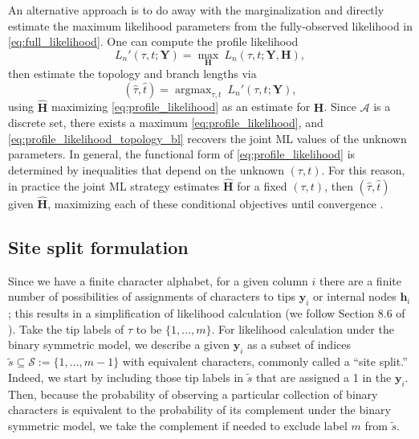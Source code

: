 \documentclass{article}
\newcommand{\alphabet}{\mathcal{A}}
\newcommand{\fullAlignment}{\mathbf{Y}}
\newcommand{\alignmentColumn}{\mathbf{y}}
\newcommand{\siteSplit}{\tilde{s}}
\newcommand{\siteSplitSet}{\mathcal{S}}
\newcommand{\fullAncestralStates}{\mathbf{H}}
\newcommand{\ancestralStateColumn}{\mathbf{h}}
\newcommand{\nCols}{n}
\newcommand{\nSiteRows}{m}
\DeclareMathOperator*{\argmax}{argmax}
\begin{document}
An alternative approach is to do away with the marginalization and directly estimate the maximum likelihood parameters from the fully-observed likelihood in \eqref{eq:full_likelihood}.
One can compute the profile likelihood
\begin{equation}
\label{eq:profile_likelihood}
L_\nCols'(\tau, t; \fullAlignment) = \max_{\fullAncestralStates} \ L_\nCols(\tau, t; \fullAlignment, \fullAncestralStates),
\end{equation}
then estimate the topology and branch lengths via
\begin{equation}
\label{eq:profile_likelihood_topology_bl}
(\hat{\tau}, \hat{t}) = \argmax_{\tau, t} \ L_\nCols'(\tau, t; \fullAlignment),
\end{equation}
using $\hat{\fullAncestralStates}$ maximizing \eqref{eq:profile_likelihood} as an estimate for $\fullAncestralStates$.
Since $\alphabet$ is a discrete set, there exists a maximum \eqref{eq:profile_likelihood}, and \eqref{eq:profile_likelihood_topology_bl} recovers the joint ML values of the unknown parameters.
In general, the functional form of \eqref{eq:profile_likelihood} is determined by inequalities that depend on the unknown $(\tau,t)$.
For this reason, in practice the joint ML strategy estimates $\hat{\fullAncestralStates}$ for a fixed $(\tau,t)$, then $(\hat{\tau},\hat{t})$ given $\hat{\fullAncestralStates}$, maximizing each of these conditional objectives until convergence \cite{Sagulenko2017-jo}.


\subsection{Site split formulation}

Since we have a finite character alphabet, for a given column $i$ there are a finite number of possibilities of assignments of characters to tips $\alignmentColumn_i$ or internal nodes $\ancestralStateColumn_i$; this results in a simplification of likelihood calculation (we follow Section 8.6 of \cite{Semple2003-em}).
Take the tip labels of $\tau$ to be $\{1,\ldots,\nSiteRows\}$.
For likelihood calculation under the binary symmetric model, we describe a given $\alignmentColumn_i$ as a subset of indices $\siteSplit\subseteq\siteSplitSet:=\{1,\ldots,\nSiteRows-1\}$ with equivalent characters, commonly called a ``site split.''
Indeed, we start by including those tip labels in $\siteSplit$ that are assigned a 1 in the $\alignmentColumn_i$.
Then, because the probability of observing a particular collection of binary characters is equivalent to the probability of its complement under the binary symmetric model, we take the complement if needed to exclude label $\nSiteRows$ from $\siteSplit$.
\end{document}
